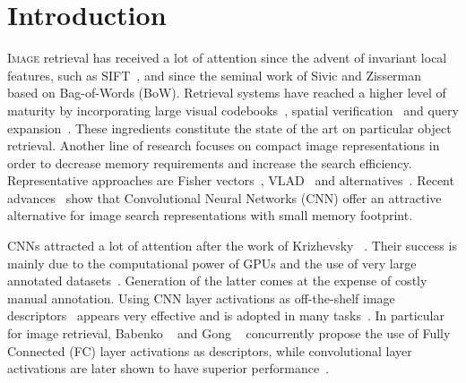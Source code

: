 \section{Introduction}
%
\lettrine{I}{mage} retrieval has received a lot of attention since the advent of invariant local features, such as SIFT~\cite{L04}, and since the seminal work of Sivic and Zisserman~\cite{SZ03} based on Bag-of-Words (BoW). 
Retrieval systems have reached a higher level of maturity by incorporating large visual codebooks~\cite{PCISZ07,AK12}, spatial verification~\cite{PCISZ07,SLBW14} and query expansion~\cite{CMPM11,DGBQG11,TJ14}. 
These ingredients constitute the state of the art on particular object retrieval.
Another line of research focuses on compact image representations in order to decrease memory requirements and increase the search efficiency. 
Representative approaches are Fisher vectors~\cite{PLSP10}, VLAD~\cite{JPDSPS11} and alternatives~\cite{RJC15,AZ13,TFJ14}.
Recent advances~\cite{BSCL14,RSMC14} show that Convolutional Neural Networks (CNN) offer an attractive alternative for image search representations with small memory footprint.

CNNs attracted a lot of attention after the work of Krizhevsky \etal~\cite{KSH12}. Their success is mainly due to the computational power of GPUs and the use of very large annotated datasets~\cite{RDSK+15}. 
Generation of the latter comes at the expense of costly manual annotation. Using CNN layer activations as off-the-shelf image descriptors~\cite{DJVO+13,RASC14} appears very effective and is adopted in many tasks~\cite{GDDM14,IMKG+14,GWGL14}. 
In particular for image retrieval, Babenko \etal~\cite{BSCL14} and Gong \etal~\cite{GWGL14} concurrently propose the use of Fully Connected (FC) layer activations as descriptors, while convolutional layer activations are later shown to have superior performance~\cite{RSMC14,BL15,KMO15,TSJ16}. 

